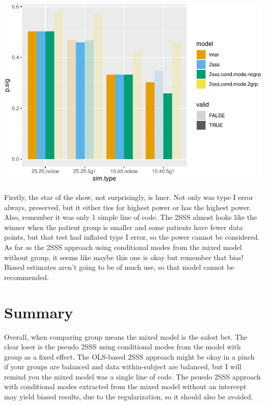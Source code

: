 \documentclass[
]{book}
\begin{document}
\includegraphics{4_video6_group_comparison_three_models_files/figure-latex/unnamed-chunk-10-1.pdf}

Firstly, the star of the show, not surprisingly, is lmer. Not only was type I error always, preserved, but it either ties for highest power or has the highest power. Also, remember it was only 1 simple line of code. The 2SSS almost looks like the winner when the patient group is smaller and some patients have fewer data points, but that test had inflated type I error, so the power cannot be considered. As far as the 2SSS approach using conditional modes from the mixed model without group, it seems like maybe this one is okay but remember that bias! Biased estimates aren't going to be of much use, so that model cannot be recommended.

\hypertarget{summary-3}{%
\section{Summary}\label{summary-3}}

Overall, when comparing group means the mixed model is the safest bet. The clear loser is the pseudo 2SSS using conditional modes from the model with group as a fixed effect. The OLS-based 2SSS approach might be okay in a pinch if your groups are balanced and data within-subject are balanced, but I will remind you the mixed model was a single line of code. The psuedo 2SSS approach with conditional modes extracted from the mixed model without an intercept may yield biased results, due to the regularization, so it should also be avoided.
\end{document}
